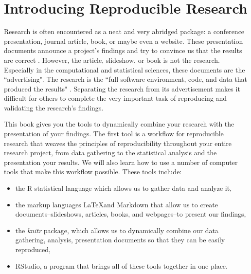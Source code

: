 



\chapter{Introducing Reproducible Research}\label{Intro}

Research is often encountered as a neat and very abridged package: a conference presentation, journal article, book, or maybe even a website. These presentation documents announce a project's findings and try to convince us that the results are correct \cite[]{Mesirov2010}. However, the article, slideshow, or book is not the research. Especially in the computational and statistical sciences, these documents are the ``advertising". The research is the ``full software environment, code, and data that produced the results" \cite[385]{Buckheit1995,Donoho2010}. Separating the research from its advertisement makes it difficult for others to complete the very important task of reproducing and validating the research's findings. 

This book gives you the tools to dynamically combine your research with the presentation of your findings. The first tool is a workflow for reproducible research that weaves the principles of reproducibility throughout your entire research project, from data gathering to the statistical analysis and the presentation your results. We will also learn how to use a number of computer tools that make this workflow possible. These tools include:

\begin{itemize}
    \item the R statistical language which allows us to gather data and analyze it,
    \item the markup languages \LaTeX and Markdown that allow us to create documents--slideshows, articles, books, and webpages--to present our findings,
    \item the {\emph{knitr}} package, which allows us to dynamically combine our data gathering, analysis, presentation documents so that they can be easily reproduced,
    \item RStudio, a program that brings all of these tools together in one place.
\end{itemize}


